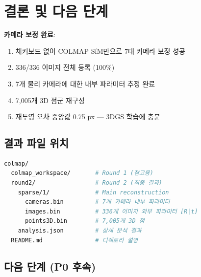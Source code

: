 \documentclass[11pt, a4paper]{report}
\begin{document}
\chapter{결론 및 다음 단계}

\begin{successbox}
\textbf{카메라 보정 완료}:
\begin{enumerate}[nosep]
  \item 체커보드 없이 COLMAP SfM만으로 7대 카메라 보정 성공
  \item 336/336 이미지 전체 등록 (100\%)
  \item 7개 물리 카메라에 대한 내부 파라미터 추정 완료
  \item 7,005개 3D 점군 재구성
  \item 재투영 오차 중앙값 0.75 px --- 3DGS 학습에 충분
\end{enumerate}
\end{successbox}

\section{결과 파일 위치}

\begin{lstlisting}[language=bash, numbers=none]
colmap/
  colmap_workspace/       # Round 1 (참고용)
  round2/                 # Round 2 (최종 결과)
    sparse/1/             # Main reconstruction
      cameras.bin         # 7개 카메라 내부 파라미터
      images.bin          # 336개 이미지 외부 파라미터 [R|t]
      points3D.bin        # 7,005개 3D 점
    analysis.json         # 상세 분석 결과
  README.md               # 디렉토리 설명
\end{lstlisting}

\section{다음 단계 (P0 후속)}
\end{document}
